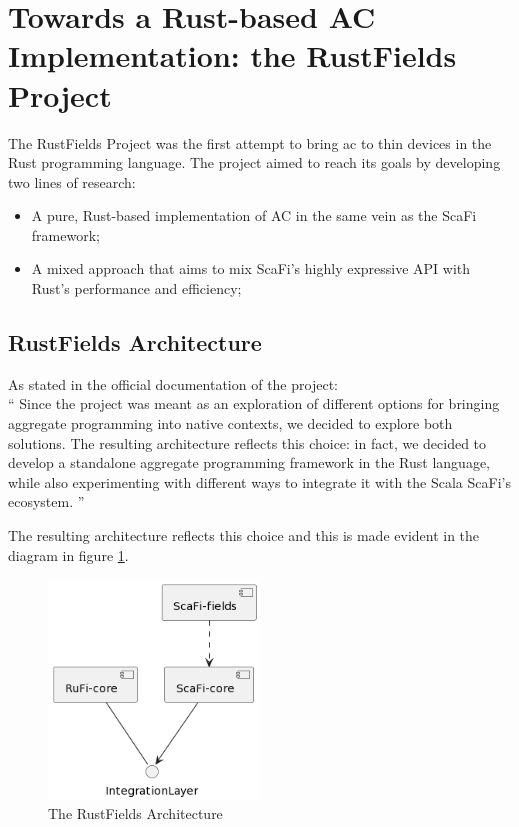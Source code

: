 \section{Towards a Rust-based AC Implementation: the RustFields Project}
The RustFields Project\cite{001} was the first attempt to bring \ac{ac} to thin devices in the Rust programming language. The project aimed to reach its goals by developing two lines of research:
\begin{itemize}
    \item A pure, Rust-based implementation of AC in the same vein as the ScaFi framework;
    \item A mixed approach that aims to mix ScaFi's highly expressive API with Rust's performance and efficiency;
\end{itemize}

\subsection{RustFields Architecture}
As stated in the official documentation of the project: \\
``    Since the project was meant as an exploration of different options for bringing aggregate programming into native contexts, we decided to explore both solutions. The resulting architecture reflects this choice: in fact, we decided to develop a standalone aggregate programming framework in the Rust language, while also experimenting with different ways to integrate it with the Scala ScaFi’s ecosystem.
''

The resulting architecture reflects this choice and this is made evident in the diagram in figure \ref{fig:rustfields-architecture}.

\begin{figure}[h]
    \centering
    \includegraphics[width=0.5\textwidth]{figures/diagrams/img/rustfields-full-architecture.png}
    \caption{The RustFields Architecture}
    \label{fig:rustfields-architecture}
\end{figure}

